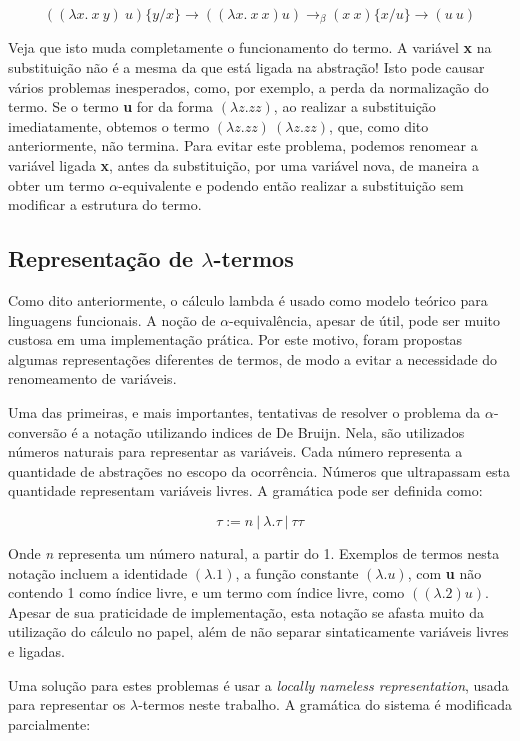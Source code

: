 \[ ((\lambda x.\ x\ y)\ u)\{y/x\} \rightarrow ((\lambda x.\ x\ x) u)
\rightarrow_\beta (x\ x)\{x/u\} \rightarrow (u\ u) \]

Veja que isto muda completamente o funcionamento do termo. A variável \textbf{x}
na substituição não é a mesma da que está ligada na abstração! Isto pode causar
vários problemas inesperados, como, por exemplo, a perda da normalização do
termo. Se o termo \textbf{u} for da forma $(\lambda z. z z)$, ao realizar a
substituição imediatamente, obtemos o termo $(\lambda z. z z)\ (\lambda z. z z)$,
que, como dito anteriormente, não termina.
Para evitar este problema, podemos renomear a variável ligada \textbf{x}, antes
da substituição, por uma variável nova, de maneira a obter um termo
$\alpha$-equivalente e podendo então realizar a substituição sem modificar a
estrutura do termo.

\subsection{Representação de $\lambda$-termos}
\label{sub:int_lnr}

Como dito anteriormente, o cálculo lambda é usado como modelo teórico para
linguagens funcionais. A noção de $\alpha$-equivalência, apesar de útil, pode ser
muito custosa em uma implementação prática. Por este motivo, foram propostas
algumas representações diferentes de termos, de modo a evitar a necessidade do
renomeamento de variáveis. 

Uma das primeiras, e mais importantes, tentativas de resolver o problema da
$\alpha$-conversão é a notação utilizando indices de De Bruijn. Nela, são
utilizados números naturais para representar as variáveis. Cada número
representa a quantidade de abstrações no escopo da ocorrência. Números que
ultrapassam esta quantidade representam variáveis livres. A gramática pode ser
definida como:

\[ \tau := n\ |\ \lambda . \tau\ |\ \tau \tau \]

Onde \textit{n} representa um número natural, a partir do 1. Exemplos de termos
nesta notação incluem a identidade $(\lambda. 1)$, a função constante $(\lambda.
u)$, com \textbf{u} não contendo 1 como índice livre, e um termo com índice
livre, como $((\lambda.2) u)$. Apesar de sua praticidade de implementação, esta
notação se afasta muito da utilização do cálculo no papel, além de não separar
sintaticamente variáveis livres e ligadas.

Uma solução para estes problemas é usar a \textit{locally nameless
representation}, usada para representar os $\lambda$-termos neste trabalho.
A gramática do sistema é modificada parcialmente:

